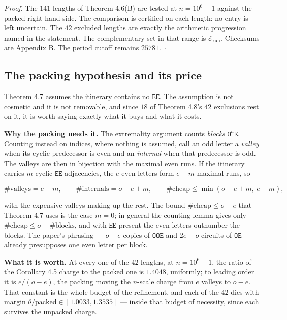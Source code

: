 \documentclass[12pt]{article}
\begin{document}
\emph{Proof.} The \(141\) lengths of Theorem 4.6(B) are tested at
\(n=10^6+1\) against the packed right-hand side. The comparison is
certified on each length: no entry is left uncertain. The \(42\)
excluded lengths are exactly the arithmetic progression named in the
statement. The complementary set in that range is
\(\mathcal E_{\mathrm{run}}\). Checksums are Appendix B. The period
cutoff remains \(25781\). \(\square\)

\subsection{The packing hypothesis and its
price}\label{the-packing-hypothesis-and-its-price}

Theorem 4.7 assumes the itinerary contains no \(\mathtt{EE}\). The
assumption is not cosmetic and it is not removable, and since \(18\) of
Theorem 4.8's \(42\) exclusions rest on it, it is worth saying exactly
what it buys and what it costs.

\textbf{Why the packing needs it.} The extremality argument counts
\emph{blocks} \(\mathtt{O}^{a}\mathtt{E}\). Counting instead on indices,
where nothing is assumed, call an odd letter a \emph{valley} when its
cyclic predecessor is even and an \emph{internal} when that predecessor
is odd. The valleys are then in bijection with the maximal even runs. If
the itinerary carries \(m\) cyclic \(\mathtt{EE}\) adjacencies, the
\(e\) even letters form \(e-m\) maximal runs, so

\[
\#\text{valleys}=e-m,\qquad
\#\text{internals}=o-e+m,\qquad
\#\text{cheap}\le\min(o-e+m,\ e-m),
\]

with the expensive valleys making up the rest. The bound
\(\#\text{cheap}\le o-e\) that Theorem 4.7 uses is the case \(m=0\); in
general the counting lemma gives only
\(\#\text{cheap}\le o-\#\text{blocks}\), and with \(\mathtt{EE}\)
present the even letters outnumber the blocks. The paper's phrasing ---
\(o-e\) copies of \(\mathtt{OOE}\) and \(2e-o\) circuits of
\(\mathtt{OE}\) --- already presupposes one even letter per block.

\textbf{What it is worth.} At every one of the \(42\) lengths, at
\(n=10^6+1\), the ratio of the Corollary 4.5 charge to the packed one is
\(1.4048\), uniformly; to leading order it is \(e/(o-e)\), the packing
moving the \(n\)-scale charge from \(e\) valleys to \(o-e\). That
constant is the whole budget of the refinement, and each of the \(42\)
dies with margin \(\theta/\text{packed}\in[1.0033,1.3535]\) --- inside
that budget of necessity, since each survives the unpacked charge.
\end{document}
